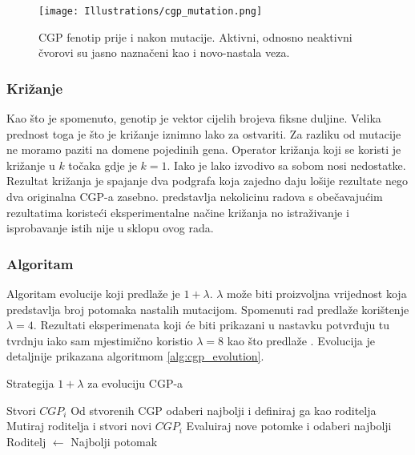 \begin{figure}
	\centering
	\texttt{[image: Illustrations/cgp\_mutation.png]}
	\caption{CGP fenotip prije i nakon mutacije. Aktivni, odnosno neaktivni čvorovi su jasno naznačeni kao i novo-nastala veza.}
	\label{fig:cgp_mutation}
\end{figure}

\subsubsection{Križanje}
Kao što je spomenuto, genotip je vektor cijelih brojeva fiksne duljine.
Velika prednost toga je što je križanje iznimno lako za ostvariti.
Za razliku od mutacije ne moramo paziti na domene pojedinih gena.
Operator križanja koji se koristi je križanje u $k$ točaka gdje je $k = 1$.
Iako je lako izvodivo sa sobom nosi nedostatke.
Rezultat križanja je spajanje dva podgrafa koja zajedno daju lošije rezultate nego dva originalna CGP-a zasebno.
\cite{cgp_experiment} predstavlja nekolicinu radova s obečavajućim rezultatima koristeći eksperimentalne načine križanja no istraživanje i isprobavanje istih nije u sklopu ovog rada.

\subsubsection{Algoritam}
Algoritam evolucije koji predlaže \cite{cgp} je $1 + \lambda$.
$\lambda$ može biti proizvoljna vrijednost koja predstavlja broj potomaka nastalih mutacijom.
Spomenuti rad predlaže korištenje $\lambda = 4$.
Rezultati eksperimenata koji će biti prikazani u nastavku potvrđuju tu tvrdnju iako sam mjestimično koristio $\lambda = 8$ kao što predlaže \cite{Sekanina2011}.
Evolucija je detaljnije prikazana algoritmom \ref{alg:cgp_evolution}.

\begin{algorithm}
	\caption{Strategija $1 + \lambda$ za evoluciju CGP-a}
	\label{alg:cgp_evolution}
	\begin{algorithmic}
			\STATE Stvori $CGP_i$
		\ENDFOR
		\STATE Od stvorenih CGP odaberi najbolji i definiraj ga kao roditelja
				\STATE Mutiraj roditelja i stvori novi $CGP_i$
			\ENDFOR
			\STATE Evaluiraj nove potomke i odaberi najbolji
				\STATE Roditelj $\leftarrow$ Najbolji potomak
			\ENDIF
		\ENDWHILE
	\end{algorithmic}
\end{algorithm}
